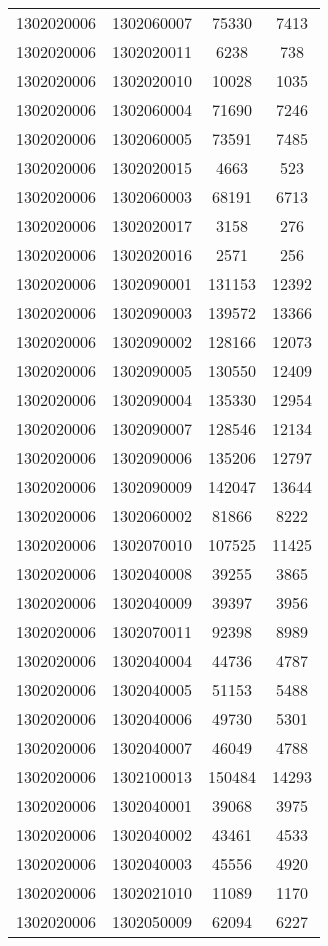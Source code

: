 \begin{longtable}[h]{llcc}
		1302020006 & 1302060007 & 75330 & 7413\\
		1302020006 & 1302020011 & 6238 & 738\\
		1302020006 & 1302020010 & 10028 & 1035\\
		1302020006 & 1302060004 & 71690 & 7246\\
		1302020006 & 1302060005 & 73591 & 7485\\
		1302020006 & 1302020015 & 4663 & 523\\
		1302020006 & 1302060003 & 68191 & 6713\\
		1302020006 & 1302020017 & 3158 & 276\\
		1302020006 & 1302020016 & 2571 & 256\\
		1302020006 & 1302090001 & 131153 & 12392\\
		1302020006 & 1302090003 & 139572 & 13366\\
		1302020006 & 1302090002 & 128166 & 12073\\
		1302020006 & 1302090005 & 130550 & 12409\\
		1302020006 & 1302090004 & 135330 & 12954\\
		1302020006 & 1302090007 & 128546 & 12134\\
		1302020006 & 1302090006 & 135206 & 12797\\
		1302020006 & 1302090009 & 142047 & 13644\\
		1302020006 & 1302060002 & 81866 & 8222\\
		1302020006 & 1302070010 & 107525 & 11425\\
		1302020006 & 1302040008 & 39255 & 3865\\
		1302020006 & 1302040009 & 39397 & 3956\\
		1302020006 & 1302070011 & 92398 & 8989\\
		1302020006 & 1302040004 & 44736 & 4787\\
		1302020006 & 1302040005 & 51153 & 5488\\
		1302020006 & 1302040006 & 49730 & 5301\\
		1302020006 & 1302040007 & 46049 & 4788\\
		1302020006 & 1302100013 & 150484 & 14293\\
		1302020006 & 1302040001 & 39068 & 3975\\
		1302020006 & 1302040002 & 43461 & 4533\\
		1302020006 & 1302040003 & 45556 & 4920\\
		1302020006 & 1302021010 & 11089 & 1170\\
		1302020006 & 1302050009 & 62094 & 6227\\

\end{longtable}
